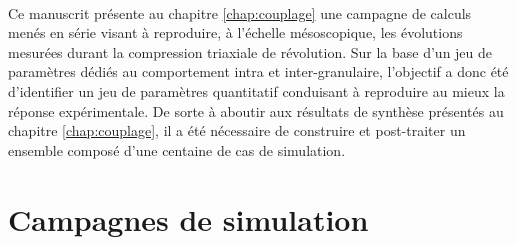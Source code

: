 	\paragraph{}
		Ce manuscrit présente au chapitre \ref{chap:couplage} une campagne de calculs menés en série visant à reproduire, à l’échelle mésoscopique, les évolutions mesurées durant la compression triaxiale de révolution. Sur la base d’un jeu de paramètres dédiés au comportement intra et inter-granulaire, l’objectif a donc été d’identifier un jeu de paramètres quantitatif conduisant à reproduire au mieux la réponse expérimentale. De sorte à aboutir aux résultats de synthèse présentés au chapitre \ref{chap:couplage}, il a été nécessaire de construire et post-traiter un ensemble composé d’une centaine de cas de simulation.

\section{Campagnes de simulation}
